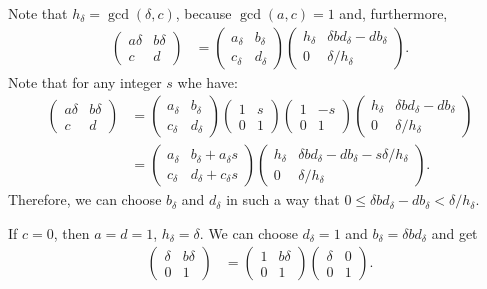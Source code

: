 \documentclass{article}
\begin{document}
\begin{Hemmecke}
Note that $h_\delta=\gcd(\delta, c)$, because $\gcd(a,c)=1$ and,
furthermore,
\begin{align}
\begin{pmatrix}a\delta&b\delta\\c&d\end{pmatrix}
&=\begin{pmatrix}a_\delta&b_\delta\\c_\delta&d_\delta\end{pmatrix}
  \begin{pmatrix}h_\delta&\delta b d_\delta-d b_\delta\\
                 0      &\delta / h_\delta\end{pmatrix}.
\label{eq:naive-matrix-split}
\end{align}
Note that for any integer $s$ whe have:
\begin{align*}
\begin{pmatrix}a\delta&b\delta\\c&d\end{pmatrix}
&=\begin{pmatrix}a_\delta&b_\delta\\c_\delta&d_\delta\end{pmatrix}
  \begin{pmatrix}1& s\\0&1\end{pmatrix}
  \begin{pmatrix}1&-s\\0&1\end{pmatrix}
  \begin{pmatrix}
    h_\delta&\delta b d_\delta-d b_\delta\\
    0      &\delta / h_\delta\end{pmatrix}
  \\
&=
  \begin{pmatrix}
    a_\delta&b_\delta + a_\delta s\\
    c_\delta&d_\delta + c_\delta s
  \end{pmatrix}
  \begin{pmatrix}h_\delta&\delta b d_\delta-d b_\delta-s \delta / h_\delta\\
                 0      &\delta / h_\delta\end{pmatrix}.
\end{align*}
Therefore, we can choose $b_\delta$ and $d_\delta$ in such a way that
$0 \le \delta b d_\delta-d b_\delta < \delta/h_\delta$.

If $c=0$, then $a=d=1$, $h_\delta=\delta$. We can choose $d_\delta=1$
and $b_\delta= \delta b  d_\delta$ and get
\begin{align}
\begin{pmatrix}\delta&b\delta\\0&1\end{pmatrix}
&=\begin{pmatrix}1&b \delta\\0&1\end{pmatrix}
  \begin{pmatrix}\delta&0\\
                 0      &1\end{pmatrix}.
\end{align}


\end{Hemmecke}
\end{document}
